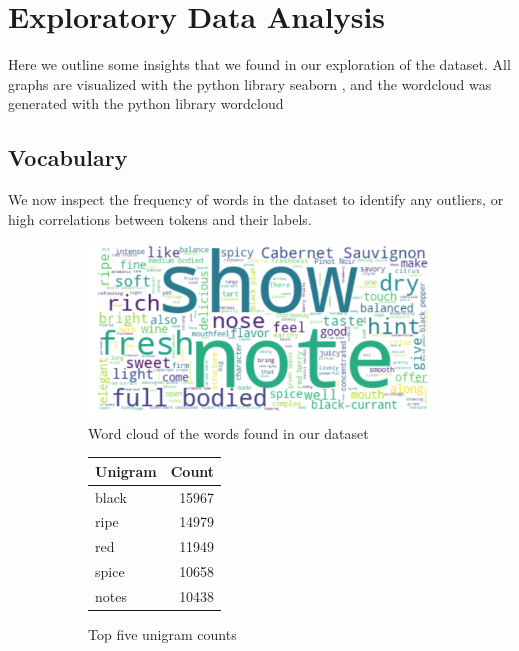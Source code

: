 \documentclass[11pt]{article}
\begin{document}
\section{Exploratory Data Analysis}
    Here we outline some insights that we found in our exploration of the dataset. All graphs are visualized with the python library seaborn \cite{seaborn}, and the wordcloud was generated with the python library wordcloud \cite{wordcloud}

\subsection{Vocabulary}
    We now inspect the frequency of words in the dataset to identify any outliers, or high correlations between tokens and their labels.

    \begin{figure}
    \centering
    \begin{subfigure}[b]{\textwidth}
        \centering
        \includegraphics[width=\textwidth]{wordcloud}
        \caption{Word cloud of the words found in our dataset}
    \end{subfigure}
    \begin{subfigure}[b]{0.33\textwidth}
        \centering
        \begin{tabular}{ lr  }
            \hline
            Unigram & Count \\
            \hline
            black  & 15967 \\
            ripe   & 14979 \\
            red    & 11949 \\
            spice  & 10658 \\
            notes  & 10438
        \end{tabular}
        \caption{ Top five unigram counts}
    \end{subfigure}
    \begin{subfigure}[b]{0.33\textwidth}

\end{subfigure}
\end{figure}
\end{document}
